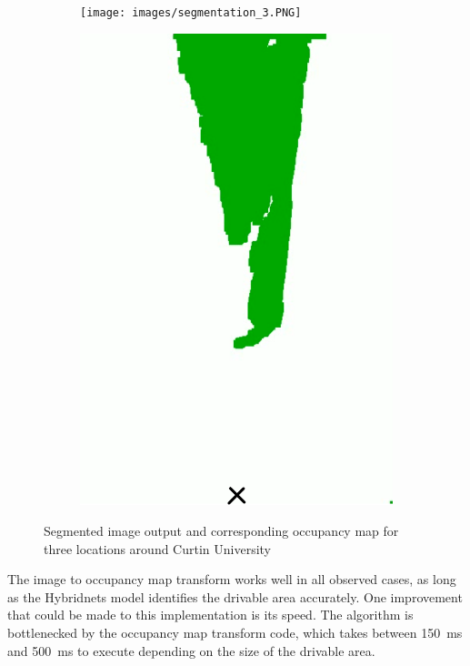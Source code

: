 \begin{figure}[p]
\begin{subfigure}{.2\textwidth}
    \end{subfigure}
    \smallskip
    \begin{subfigure}{.55\textwidth}
        \centering
        \texttt{[image: images/segmentation\_3.PNG]}
    \end{subfigure}
    \quad
    \begin{subfigure}{.2\textwidth}
        \centering
        \includegraphics[width=\linewidth,frame]{images/occupancy_map3.png}
    \end{subfigure}
    \caption{Segmented image output and corresponding occupancy map for three locations around Curtin University}
    \label{fig:occupancy_map_seg}
\end{figure}
\pagebreak

The image to occupancy map transform works well in all observed cases, as long as the Hybridnets model identifies the
drivable area accurately. One improvement that could be made to this implementation is its speed.
The algorithm is bottlenecked by the occupancy map transform code, which takes between \SI{150}{\milli\second}
and \SI{500}{\milli\second} to execute depending on the size of the drivable area.

